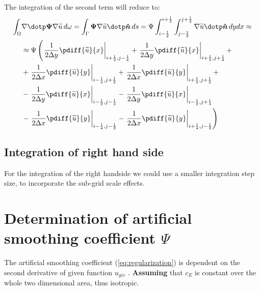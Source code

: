 The integration of the second  term will reduce to:
\begin{align}
    \int_\Omega & \nabla \dotp \bPsi \nabla \widetilde{u}\, d\omega  =
    \int_\Gamma \bPsi \nabla \widetilde{u} \dotp \vec{\hat n}\, ds =
    \Psi
    \int_{i-\half}^{i+\half} \int_{j-\half}^{j+\half} \nabla \widetilde{u} \dotp \vec{\hat n}\, dy dx
    \approx
    \\
    & \approx
      \Psi \left(
      \left. \frac{1}{2\Dy} \pdiff{\widetilde{u}}{x}  \right|_{i+\half,j-\quart}
    + \left. \frac{1}{2\Dy} \pdiff{\widetilde{u}}{x}  \right|_{i+\half,j+\quart} +
    \right.
    \\
    &
    + \left. \frac{1}{2\Dx} \pdiff{\widetilde{u}}{y}  \right|_{i-\quart,j+\half}
    + \left. \frac{1}{2\Dx} \pdiff{\widetilde{u}}{y}  \right|_{i+\quart,j+\half} +
    \\
    &
    - \left. \frac{1}{2\Dy} \pdiff{\widetilde{u}}{x} \right|_{i-\half,j-\quart}
    - \left. \frac{1}{2\Dy} \pdiff{\widetilde{u}}{x} \right|_{i-\half,j+\quart}
    \\
    &
    \left.
    - \left. \frac{1}{2\Dx} \pdiff{\widetilde{u}}{y}   \right|_{i-\quart,j-\half}
    - \left. \frac{1}{2\Dx} \pdiff{\widetilde{u}}{y}   \right|_{i+\quart,j-\half}
    \right)
\end{align}
\subsection*{Integration of right hand side}
For the integration of the right handside we could use a smaller integration step size, to incorporate the sub-grid scale effects.

\section{Determination of artificial smoothing coefficient $\Psi$}
The artificial smoothing coefficient (\autoref{eq:regularization}) is dependent on the second derivative of given function $u_{giv}$ \citep[eq.\ 8]{Borsboom1998}.
\textbf{Assuming} that $c_E$ is constant over the whole two dimensional area, thus isotropic.


